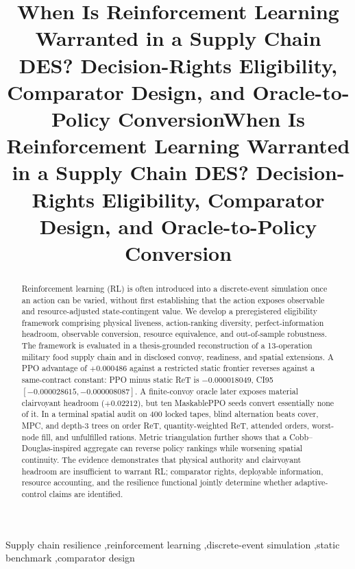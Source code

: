 \documentclass[preprint,12pt]{elsarticle}
\newif\ifuseelsevier
\newif\ifuseelsevier
\begin{document}
\ifuseelsevier
\begin{frontmatter}
\title{When Is Reinforcement Learning Warranted in a Supply Chain DES? Decision-Rights Eligibility, Comparator Design, and Oracle-to-Policy Conversion}
\begin{abstract}
Reinforcement learning (RL) is often introduced into a discrete-event simulation once an action can be varied, without first establishing that the action exposes observable and resource-adjusted state-contingent value. We develop a preregistered eligibility framework comprising physical liveness, action-ranking diversity, perfect-information headroom, observable conversion, resource equivalence, and out-of-sample robustness. The framework is evaluated in a thesis-grounded reconstruction of a 13-operation military food supply chain and in disclosed convoy, readiness, and spatial extensions. A PPO advantage of $+0.000486$ against a restricted static frontier reverses against a same-contract constant: PPO minus static ReT is $-0.000018049$, CI95 $[-0.000028615,-0.000008087]$. A finite-convoy oracle later exposes material clairvoyant headroom ($+0.02212$), but ten MaskablePPO seeds convert essentially none of it. In a terminal spatial audit on 400 locked tapes, blind alternation beats cover, MPC, and depth-3 trees on order ReT, quantity-weighted ReT, attended orders, worst-node fill, and unfulfilled rations. Metric triangulation further shows that a Cobb--Douglas-inspired aggregate can reverse policy rankings while worsening spatial continuity. The evidence demonstrates that physical authority and clairvoyant headroom are insufficient to warrant RL; comparator rights, deployable information, resource accounting, and the resilience functional jointly determine whether adaptive-control claims are identified.
\end{abstract}
\begin{keyword}
Supply chain resilience \sep reinforcement learning \sep discrete-event simulation \sep static benchmark \sep comparator design
\end{keyword}
\end{frontmatter}
\else
\title{When Is Reinforcement Learning Warranted in a Supply Chain DES? Decision-Rights Eligibility, Comparator Design, and Oracle-to-Policy Conversion}
\author{}
\date{}
\maketitle
\end{document}
